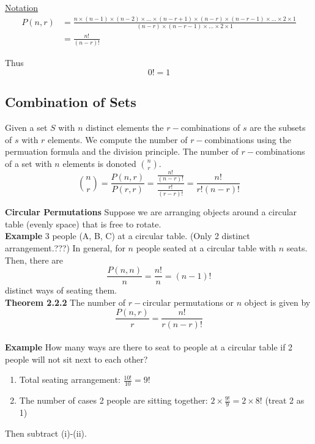 \documentclass[12pt]{article}
\begin{document}
\vspace{1.5\baselineskip}
\underline{Notation} 
\begin{align}
P(n,r) &= \frac{n\times (n-1) \times (n-2) \times \ldots \times (n-r+1)\times (n-r)\times (n-r-1)\times\ldots\times 2\times 1}{(n-r)\times(n-r-1)\times\ldots\times 2\times 1}\nonumber \\
&=\frac{n!}{(n-r)!} \nonumber
\end{align}

\vspace{1.5\baselineskip}
Thus $$0! = 1$$

\newpage
\subsection{Combination of Sets}
Given a set $S$ with $n$ distinct elements the $r-$combinations of $s$ are the subsets of $s$ with $r$ elements. We compute the number of $r-$combinations using the permuation formula and the division principle. The number of $r-$combinations of a set with $n$ elements is donoted $\binom{n}{r}$.
$$\binom{n}{r} = \frac{P(n,r)}{P(r,r)} = \frac{\frac{n!}{(n-r)!}}{\frac{r!}{(r-r)!}} = \frac{n!}{r!(n-r)!}$$

{\bf Circular Permutations}
Suppose we are arranging objects around a circular table (evenly space) that is free to rotate.\\

{\bf Example} 3 people (A, B, C) at a circular table. (Only 2 distinct arrangement.???) In general, for $n$ people seated at a circular table with $n$ seats. Then, there are 
$$\frac{P(n,n)}{n} = \frac{n!}{n} = (n-1)!$$ distinct ways of seating them.\\

{\bf Theorem 2.2.2} The number of $r-$circular permutations or $n$ object is given by $$\frac{P(n,r)}{r} = \frac{n!}{r(n-r)!}$$\\

{\bf Example} How many ways are there to seat to people at a circular table if 2 people will not sit next to each other?
\begin{enumerate}[label=(\roman*)]
    \item Total seating arrangement: $\frac{10!}{10}=9!$
    \item The number of cases 2 people are sitting together: $2\times \frac{9!}{9} = 2\times 8!$ \hfill (treat 2 as 1)
\end{enumerate}
Then subtract (i)-(ii).\\
\end{document}
